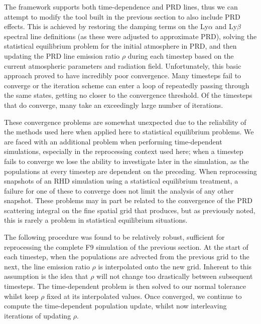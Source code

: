 The \Lw{} framework supports both time-dependence and PRD lines, thus we can attempt to modify the tool built in the previous section to also include PRD effects.
This is achieved by restoring the damping terms on the Ly$\alpha$ and Ly$\beta$ spectral line definitions (as these were adjusted to approximate PRD), solving the statistical equilibrium problem for the initial atmosphere in PRD, and then updating the PRD line emission ratio $\rho$ during each timestep based on the current atmospheric parameters and radiation field.
Unfortunately, this basic approach proved to have incredibly poor convergence.
Many timesteps fail to converge or the iteration scheme can enter a loop of repeatedly passing through the same states, getting no closer to the convergence threshold.
Of the timesteps that do converge, many take an exceedingly large number of iterations.

These convergence problems are somewhat unexpected due to the reliability of the methods used here when applied here to statistical equilibrium problems.
We are faced with an additional problem when performing time-dependent simulations, especially in the reprocessing context used here; when a timestep fails to converge we lose the ability to investigate later in the simulation, as the populations at every timestep are dependent on the preceding.
When reprocessing snapshots of an RHD simulation using a statistical equilibrium treatment, a failure for one of these to converge does not limit the analysis of any other snapshot.
These problems may in part be related to the convergence of the PRD scattering integral on the fine spatial grid that \Radyn{} produces, but as previously noted, this is rarely a problem in statistical equilibrium situations.

The following procedure was found to be relatively robust, sufficient for reprocessing the complete F9 simulation of the previous section.
At the start of each timestep, when the populations are advected from the previous grid to the next, the line emission ratio $\rho$ is interpolated onto the new grid.
Inherent to this assumption is the idea that $\rho$ will not change too drastically between subsequent timesteps.
The time-dependent problem is then solved to our normal tolerance whilst keep $\rho$ fixed at its interpolated values.
Once converged, we continue to compute the time-dependent population update, whilst now interleaving iterations of updating $\rho$.

